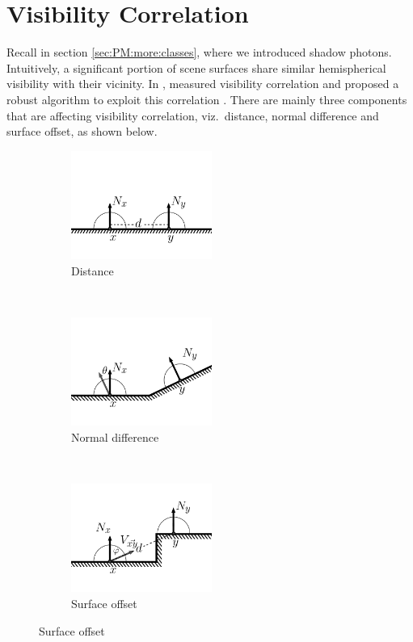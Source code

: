 \documentclass[]{book}
\begin{document}
\section{Visibility Correlation}
\label{sec:VC:correlation}
Recall in section \ref{sec:PM:more:classes}, where we introduced shadow photons.
Intuitively, a significant portion of scene surfaces share similar hemispherical visibility with their vicinity.
In \citeyear{clarberg2008VisCorrelation}, \citeauthor{clarberg2008VisCorrelation} measured visibility correlation and proposed a robust algorithm to exploit this correlation \cite{clarberg2008VisCorrelation}.
There are mainly three components that are affecting visibility correlation, viz.\ distance, normal difference and surface offset, as shown below.

\begin{figure}[!ht]
	\begin{subfigure}{0.33\textwidth}
		\includegraphics[height=1.4in]{img/VC-2-distance.png}
		\caption{Distance}
	\end{subfigure}%
	~
	\begin{subfigure}{0.33\textwidth}
		\includegraphics[height=1.4in]{img/VC-2-normal.png}
		\caption{Normal difference}
	\end{subfigure}%
	~
	\begin{subfigure}{0.33\textwidth}
		\includegraphics[height=1.4in]{img/VC-2-displace.png}
		\caption{Surface offset}
	\end{subfigure}%
\end{figure}
\end{document}
